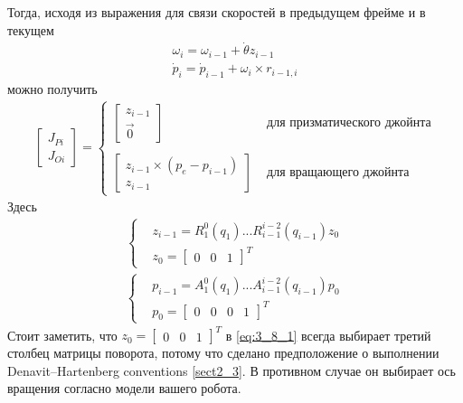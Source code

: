 Тогда, исходя из выражения для связи скоростей в предыдущем фрейме и в текущем
\begin{align*}
	\omega_{i} = \omega_{i-1} + \dot{\theta}z_{i-1}\\
	\dot{p}_{i} = \dot{p}_{i-1} + \omega_{i} \times r_{i-1,i}
\end{align*}
можно получить\cite{Bruno}
\begin{align*}
	\begin{bmatrix}
		J_{Pi}\\
		J_{Oi}
	\end{bmatrix}=
		\begin{cases}
			\begin{bmatrix}
				z_{i-1}\\
				\vec{0}
			\end{bmatrix} & \text{ для призматического джойнта}\\\\	
			\begin{bmatrix}
				z_{i-1} \times (p_{e} - p_{i-1})\\
				z_{i-1}
			\end{bmatrix} & \text{ для вращающего джойнта}
		\end{cases}
\end{align*}
Здесь 
\begin{equation}\label{eq:3_8_1}
	\begin{aligned}
		\begin{cases}
			&z_{i-1} = R^{0}_{1}(q_{1}) ... R^{i-2}_{i-1}(q_{i-1})z_{0}\\
			&z_{0} = \begin{bmatrix}
				0	&	0	&	1
			\end{bmatrix}^{T}
		\end{cases}
	\end{aligned}
\end{equation}
\begin{align*}
	\begin{cases}
		&p_{i-1} = A^{0}_{1}(q_{1}) ... A^{i-2}_{i-1}(q_{i-1})p_{0}\\
		&p_{0} = \begin{bmatrix}
			0	&	0	&	0	& 	1
		\end{bmatrix}^{T}
	\end{cases}	
\end{align*}
Стоит заметить, что $z_{0} = \begin{bmatrix}0	&	0	&	1\end{bmatrix}^{T}$ в \ref{eq:3_8_1} всегда выбирает третий столбец матрицы поворота, потому что сделано предположение о выполнении Denavit–Hartenberg conventions \ref{sect2_3}. В противном случае он выбирает ось вращения согласно модели вашего робота.